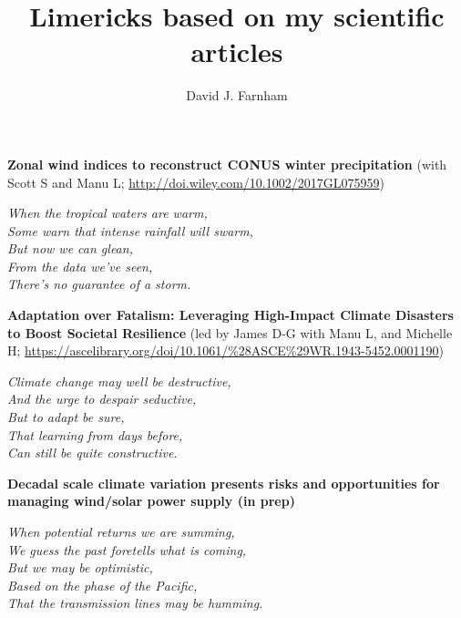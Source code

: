 \documentclass{article}
\title{
Limericks based on my scientific articles
}
\author{David J. Farnham}
\begin{document}
\maketitle




\noindent
\textbf{Zonal wind indices to reconstruct CONUS winter precipitation} (with Scott S and Manu L; \url{http://doi.wiley.com/10.1002/2017GL075959})\\

\vspace{0.25cm}

{\large
\noindent
\textit{When the tropical waters are warm,\\
Some warn that intense rainfall will swarm,\\
\null \hspace{0.5cm} But now we can glean,\\
\null \hspace{0.5cm} From the data we've seen,\\
There's no guarantee of a storm.}
}

\vspace{1.0cm}


\noindent
\textbf{Adaptation over Fatalism: Leveraging High-Impact Climate Disasters to Boost Societal Resilience} (led by James D-G with Manu L, and Michelle H; \url{https://ascelibrary.org/doi/10.1061/%28ASCE%29WR.1943-5452.0001190})\\

\vspace{0.25cm}

{\large
\noindent
\textit{Climate change may well be destructive,\\
And the urge to despair seductive,\\
\null \hspace{0.5cm} But to adapt be sure,\\
\null \hspace{0.5cm} That learning from days before,\\
Can still be quite constructive.}
}

\vspace{1.0cm}

\noindent
\textbf{Decadal scale climate variation presents risks and opportunities for managing wind/solar power supply (in prep)}\\

\vspace{0.25cm}

{\large
\noindent
\textit{When potential returns we are summing,\\
We guess the past foretells what is coming,\\
\null \hspace{0.5cm} But we may be optimistic,\\
\null \hspace{0.5cm} Based on the phase of the Pacific,\\
That the transmission lines may be humming.}
}
\end{document}
